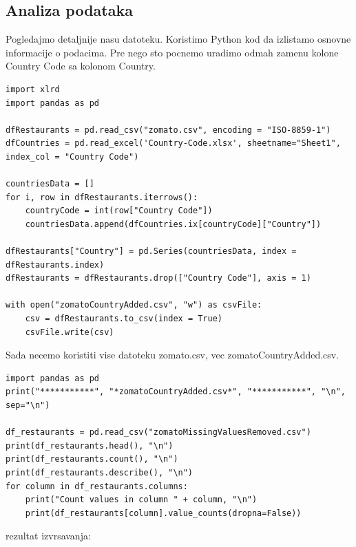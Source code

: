 \documentclass[11pt]{article} %
\begin{document}
\subsection{Analiza podataka}
Pogledajmo detaljnije nasu datoteku. Koristimo Python kod da izlistamo osnovne informacije o podacima.
Pre nego sto pocnemo uradimo odmah zamenu kolone Country Code sa kolonom Country.
\begin{lstlisting}
import xlrd
import pandas as pd

dfRestaurants = pd.read_csv("zomato.csv", encoding = "ISO-8859-1")
dfCountries = pd.read_excel('Country-Code.xlsx', sheetname="Sheet1", index_col = "Country Code")

countriesData = []
for i, row in dfRestaurants.iterrows():
    countryCode = int(row["Country Code"])
    countriesData.append(dfCountries.ix[countryCode]["Country"])

dfRestaurants["Country"] = pd.Series(countriesData, index = dfRestaurants.index)
dfRestaurants = dfRestaurants.drop(["Country Code"], axis = 1)

with open("zomatoCountryAdded.csv", "w") as csvFile:
    csv = dfRestaurants.to_csv(index = True)
    csvFile.write(csv)
\end{lstlisting}
Sada necemo koristiti vise datoteku zomato.csv, vec zomatoCountryAdded.csv.
\begin{lstlisting}
import pandas as pd
print("***********", "*zomatoCountryAdded.csv*", "***********", "\n", sep="\n")

df_restaurants = pd.read_csv("zomatoMissingValuesRemoved.csv")
print(df_restaurants.head(), "\n")
print(df_restaurants.count(), "\n")
print(df_restaurants.describe(), "\n")
for column in df_restaurants.columns:
    print("Count values in column " + column, "\n")
    print(df_restaurants[column].value_counts(dropna=False))

\end{lstlisting}
rezultat izvrsavanja:
\end{document}

